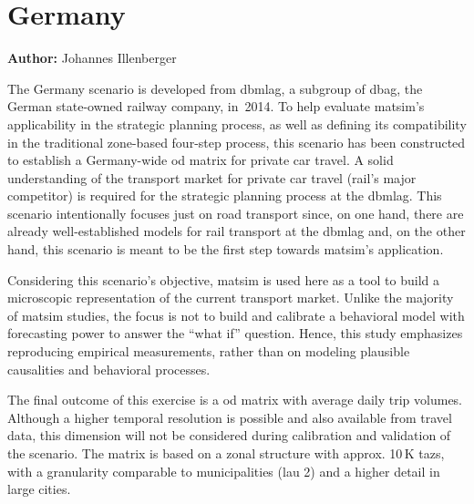 \chapter{Germany}
\label{ch:germany}
\hfill \textbf{Author:} Johannes Illenberger


The Germany scenario is developed from \gls{dbmlag}, a subgroup of \gls{dbag}, the German state-owned railway company, in~2014. To help evaluate \gls{matsim}'s applicability in the strategic planning process, as well as defining its compatibility in the traditional zone-based four-step process, this scenario has been constructed to establish a Germany-wide \gls{od} matrix for private car travel. A solid understanding of the transport market for private car travel (rail's major competitor) is required for the strategic planning process at the \gls{dbmlag}. This scenario intentionally focuses just on road transport since, on one hand, there are already well-established models for rail transport at the \gls{dbmlag} and, on the other hand, this scenario is meant to be the first step towards \gls{matsim}'s application.

Considering this scenario's objective, \gls{matsim} is used here as a tool to build a microscopic representation of the current transport market. Unlike the majority of \gls{matsim} studies, the focus is not to build and calibrate a behavioral model with forecasting power to answer the ``what if'' question. Hence, this study emphasizes reproducing empirical measurements, rather than on modeling plausible causalities and behavioral processes.

The final outcome of this exercise is a \gls{od} matrix with average daily trip volumes. Although a higher temporal resolution is possible and also available from travel data, this dimension will not be considered during calibration and validation of the scenario. The matrix is based on a zonal structure with approx. 10\,K \glspl{taz}, with a granularity comparable to municipalities (\gls{lau} 2) and a higher detail in large cities.

